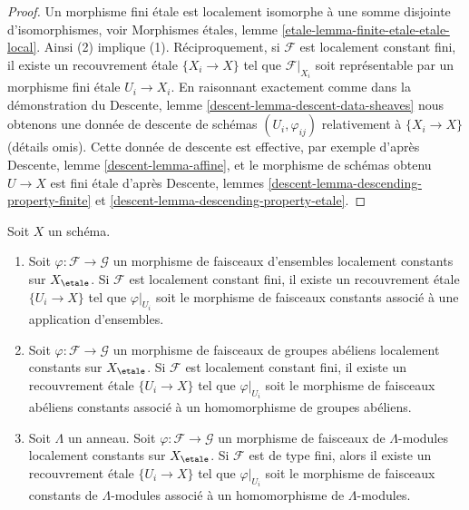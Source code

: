 \begin{proof}
Un morphisme fini \'etale est localement isomorphe \`a une somme disjointe
d'isomorphismes, voir
Morphismes étales, lemme \ref{etale-lemma-finite-etale-etale-local}.
Ainsi (2) implique (1). R\'eciproquement, si $\mathcal{F}$ est localement
constant fini, il existe un recouvrement \'etale $\{X_i \to X\}$ tel que
$\mathcal{F}|_{X_i}$ soit repr\'esentable par un morphisme fini \'etale $U_i \to X_i$.
En raisonnant exactement comme dans la d\'emonstration du
Descente, lemme \ref{descent-lemma-descent-data-sheaves}
nous obtenons une donn\'ee de descente de sch\'emas $(U_i, \varphi_{ij})$ relativement \`a
$\{X_i \to X\}$ (d\'etails omis). Cette donn\'ee de descente est effective, par
exemple d'apr\`es Descente, lemme \ref{descent-lemma-affine},
et le morphisme de sch\'emas obtenu $U \to X$ est fini \'etale
d'apr\`es Descente, lemmes \ref{descent-lemma-descending-property-finite} et
\ref{descent-lemma-descending-property-etale}.
\end{proof}

\begin{lemma}
\label{lemma-morphism-locally-constant}
Soit $X$ un sch\'ema.
\begin{enumerate}
\item Soit $\varphi : \mathcal{F} \to \mathcal{G}$ un morphisme
de faisceaux d'ensembles localement constants sur $X_\etale$.
Si $\mathcal{F}$ est localement constant fini, il existe un
recouvrement \'etale $\{U_i \to X\}$ tel que
$\varphi|_{U_i}$ soit le morphisme de faisceaux constants associ\'e \`a
une application d'ensembles.
\item Soit $\varphi : \mathcal{F} \to \mathcal{G}$ un morphisme
de faisceaux de groupes ab\'eliens localement constants sur $X_\etale$.
Si $\mathcal{F}$ est localement constant fini, il existe un recouvrement \'etale
$\{U_i \to X\}$ tel que $\varphi|_{U_i}$ soit le morphisme de
faisceaux ab\'eliens constants associ\'e \`a un homomorphisme de groupes ab\'eliens.
\item Soit $\Lambda$ un anneau.
Soit $\varphi : \mathcal{F} \to \mathcal{G}$ un morphisme
de faisceaux de $\Lambda$-modules localement constants sur $X_\etale$.
Si $\mathcal{F}$ est de type fini, alors il existe un recouvrement \'etale
$\{U_i \to X\}$ tel que $\varphi|_{U_i}$ soit le morphisme de
faisceaux constants de $\Lambda$-modules associ\'e \`a un homomorphisme de $\Lambda$-modules.
\end{enumerate}
\end{lemma}

